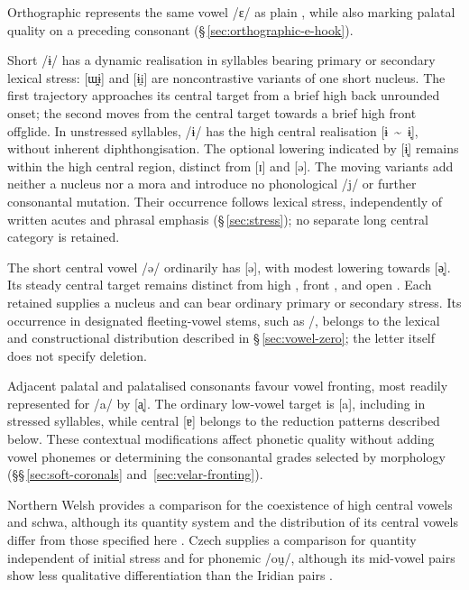 Orthographic  represents the same vowel /ɛ/ as plain ,
while also marking palatal quality on a preceding consonant
(§\,\ref{sec:orthographic-e-hook}).

Short  /ɨ/ has a dynamic realisation in syllables bearing primary
or secondary lexical stress: [ɯ̯ɨ] and [ɨi̯] are noncontrastive variants
of one short nucleus. The first trajectory approaches its central target
from a brief high back unrounded onset; the second moves from the central
target towards a brief high front offglide. In unstressed syllables, /ɨ/
has the high central realisation [ɨ~\textasciitilde{}~ɨ̞], without inherent
diphthongisation. The optional lowering indicated by [ɨ̞] remains within
the high central region, distinct from  [ɪ] and  [ə].
The moving variants add neither a nucleus nor a mora and introduce no
phonological /j/ or further consonantal mutation. Their occurrence follows
lexical stress, independently of written acutes and phrasal emphasis
(§\,\ref{sec:stress}); no separate long central category is retained.

The short central vowel  /ə/ ordinarily has [ə], with modest
lowering towards [ə̞]. Its steady central target remains distinct from
high , front , and open . Each retained 
supplies a nucleus and can bear ordinary primary or secondary stress.
Its occurrence in designated fleeting-vowel stems, such as
/, belongs to the lexical and constructional
distribution described in §\,\ref{sec:vowel-zero}; the letter itself
does not specify deletion.

Adjacent palatal and palatalised consonants favour vowel fronting, most
readily represented for /a/ by [a̟]. The ordinary low-vowel target is [a],
including in stressed syllables, while central [ɐ] belongs to the reduction
patterns described below. These contextual modifications affect phonetic
quality without adding vowel phonemes or determining the consonantal grades
selected by morphology
(§§\,\ref{sec:soft-coronals} and~\ref{sec:velar-fronting}).

Northern Welsh provides a comparison for the coexistence of high central
vowels and schwa, although its quantity system and the distribution of its
central vowels differ from those specified here \cite[pp.~499--500]{bell2023}.
Czech supplies a comparison for quantity independent of initial stress
and for phonemic /ou̯/, although its mid-vowel pairs show less qualitative
differentiation than the Iridian pairs
\cite{simackova2012}.


